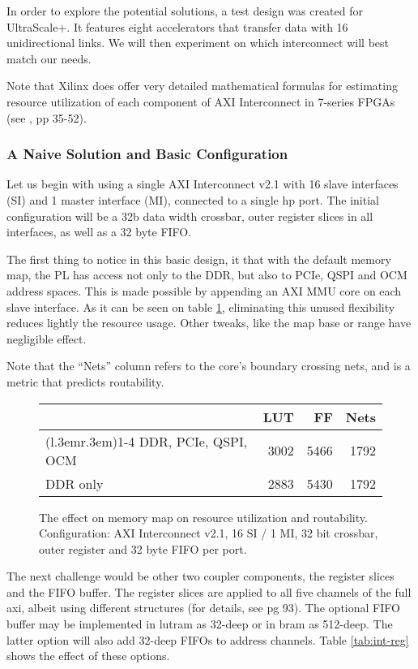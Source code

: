 In order to explore the potential solutions, a test design was created for UltraScale+.
It features eight accelerators that transfer data with 16 unidirectional links.
We will then experiment on which interconnect will best match our needs.

Note that Xilinx does offer very detailed mathematical formulas
for estimating resource utilization of each component of AXI Interconnect
in 7-series FPGAs (see \cite{pg059}, pp 35-52).

\subsubsection{A Naive Solution and Basic Configuration}

Let us begin with using a single AXI Interconnect v2.1
with 16 slave interfaces (SI) and 1 master interface (MI),
connected to a single \gls{hp} port. The initial configuration
will be a 32b data width crossbar, outer register slices in all interfaces,
as well as a 32 byte FIFO.

The first thing to notice in this basic design,
it that with the default memory map, the PL has access not only to the DDR,
but also to PCIe, QSPI and OCM address spaces.
This is made possible by appending an AXI MMU core on each slave interface.
As it can be seen on table \ref{tab:int-mmu}, eliminating this unused flexibility
reduces lightly the resource usage. Other tweaks, like the map base or range
have negligible effect.

Note that the ``Nets'' column refers to the core's boundary crossing nets,
and is a metric that predicts routability.

\begin{figure}[ht!]
\centering
\begin{tabular}{lrrr}
\toprule
			& LUT	& FF	& Nets \\
\cmidrule(l{.3em}r{.3em}){1-4}
DDR, PCIe, QSPI, OCM	& 3002	& 5466	& 1792\\
DDR only		& 2883	& 5430	& 1792\\
\bottomrule
\end{tabular}
\caption{The effect on memory map on resource utilization and routability.\\
	Configuration: AXI Interconnect v2.1, 16 SI / 1 MI, 32 bit crossbar,
	outer register and 32 byte FIFO per port.}
\label{tab:int-mmu}
\end{figure}

The next challenge would be other two coupler components, the register slices
and the FIFO buffer. The register slices are applied to all five channels of the full \gls{axi},
albeit using different structures (for details, see \cite{pg059} pg 93).
The optional FIFO buffer may be implemented in \gls{lutram} as 32-deep or in \gls{bram}
as 512-deep. The latter option will also add 32-deep FIFOs to address channels.
Table \ref{tab:int-reg} shows the effect of these options.

